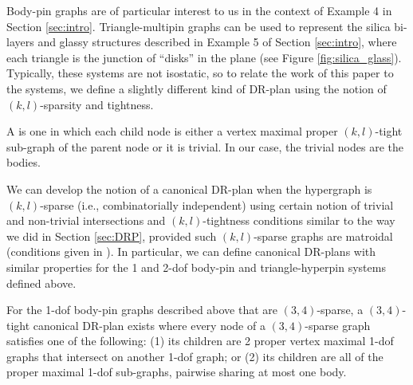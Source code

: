 Body-pin graphs are of particular interest to us in the context of Example 4 in Section \ref{sec:intro}. Triangle-multipin graphs can be used to represent the silica bi-layers and glassy structures described in Example 5 of Section \ref{sec:intro}, where each triangle is the junction of ``disks'' in the plane (see Figure \ref{fig:silica_glass}). Typically, these systems are not isostatic, so to relate the work of this paper to the systems, we define a slightly different kind of DR-plan using the notion of $(k,l)$-sparsity and tightness.

\begin{definition}
    A  is one in which each child node is either a vertex maximal proper $(k,l)$-tight sub-graph of the parent node or it is trivial. In our case, the trivial nodes are  the bodies.
\end{definition}

We can develop the notion of a canonical DR-plan when the hypergraph is $(k,l)$-sparse (i.e., combinatorially independent) using certain notion of trivial and non-trivial intersections and $(k,l)$-tightness conditions similar to the way we did in Section \ref{sec:DRP}, provided such $(k,l)$-sparse graphs are matroidal (conditions given in \cite{Lee:2007:PGA}). In particular, we can define canonical DR-plans with similar properties for the 1 and 2-dof body-pin and triangle-hyperpin systems defined above.


\begin{observation*}
\label{obs:bodypin_drp}
    For the 1-dof body-pin graphs described above that are $(3,4)$-sparse, a $(3,4)$-tight canonical DR-plan exists where every node of a $(3,4)$-sparse graph satisfies one of the following: (1) its children are 2 proper vertex maximal 1-dof graphs that intersect on another 1-dof graph; or (2) its children are all of the proper maximal 1-dof sub-graphs, pairwise sharing at most one body.
\end{observation*}


